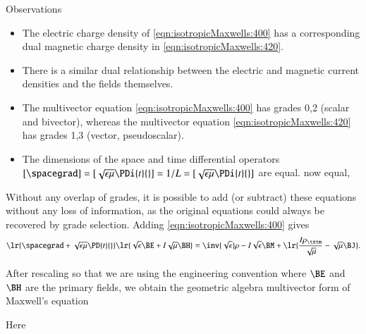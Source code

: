 Observations
\begin{itemize}
\item
The electric charge density of \cref{eqn:isotropicMaxwells:400} has a corresponding dual magnetic charge density in \cref{eqn:isotropicMaxwells:420}.
\item
There is a similar dual relationship between the electric and magnetic current densities and the fields themselves.
\item
The multivector equation \cref{eqn:isotropicMaxwells:400} has grades 0,2 (scalar and bivector), whereas the multivector equation \cref{eqn:isotropicMaxwells:420} has grades 1,3 (vector, pseudoscalar).
\item
The
dimensions of the space and time differential operators \( [\spacegrad] = [\sqrt{\epsilon\mu} \PDi{t}{}] = 1/L = [\sqrt{\epsilon\mu}\PDi{t}{}]\) are equal.
now equal,
\end{itemize}

Without any overlap of grades, it is possible to add (or subtract) these equations without any loss of information, as
the original equations could always be recovered by grade selection.
Adding \cref{eqn:isotropicMaxwells:400} gives
\begin{dmath}\label{eqn:isotropicMaxwells:440}
\lr{ \spacegrad + \sqrt{\epsilon\mu} \PD{t}{} }
\lr{ \sqrt{\epsilon} \BE
+
I \sqrt{\mu} \BH
}
=
\inv{\sqrt{\epsilon}} \rho
- I \sqrt{\epsilon} \BM
+\lr{
\frac{I \rho_\txtm}{\sqrt{\mu}}
- \sqrt{\mu} \BJ
}
.
\end{dmath}

After rescaling so that we are using
the engineering convention where \( \BE \) and \( \BH \) are the primary fields, we obtain the geometric algebra multivector form of Maxwell's equation

Here

